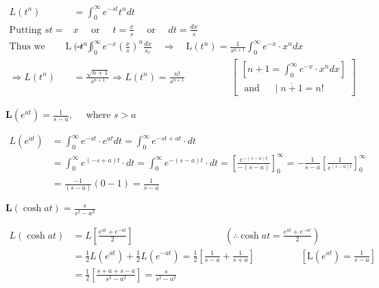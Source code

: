 \begin{answer}
	\begin{align*}
	L\left(t^{n}\right)&=\int_{0}^{\infty} e^{-s t} t^{n} d t\\
	\text{Putting }s t=&x \quad\text{ or }\quad t=\frac{x}{s} \quad\text{ or } \quad d t=\frac{d x}{s}\\
	\text{Thus we have}\mathrm{L}\left(t^{n}\right)&=\int_{0}^{\infty} e^{-x}\left(\frac{x}{s}\right)^{n} \frac{d x}{s_{r}} \quad \Rightarrow \quad \mathrm{L}\left(t^{n}\right)=\frac{1}{s^{n+1}} \int_{0}^{\infty} e^{-x} \cdot x^{n} d x\\
	\Rightarrow L\left(t^{n}\right)&=\frac{\sqrt{n+1}}{s^{n+1}} \Rightarrow L\left(t^{n}\right)=\frac{n !}{s^{n+1}}\hspace{2cm}\left[\begin{array}{c}
	{\left[n+1=\int_{0}^{\infty} e^{-x} \cdot x^{n} d x\right] } \\
	\text { and } \quad \mid \overline{n+1}=n !
	\end{array}\right]
	\end{align*}
\end{answer}
\begin{exercise}
	$\mathbf{L}\left(e^{a t}\right)=\frac{1}{s-a}, \quad$ where $s>a$
\end{exercise}
\begin{answer}
	\begin{align*}
	L\left(e^{a t}\right) &=\int_{0}^{\infty} e^{-s t} \cdot e^{a t} d t=\int_{0}^{\infty} e^{-s t+a t} \cdot d t \\
	&=\int_{0}^{\infty} e^{(-s+a) t} \cdot d t=\int_{0}^{\infty} e^{-(s-a) t} \cdot d t=\left[\frac{e^{-(s-a) t}}{-(s-a)}\right]_{0}^{\infty}=-\frac{1}{s-a}\left[\frac{1}{e^{(s-a) t}}\right]_{0}^{\infty}\\
	&=\frac{-1}{(s-a)}(0-1)=\frac{1}{s-a}
	\end{align*}
\end{answer}
\begin{exercise}
	$\mathbf{L}(\cosh a t)=\frac{s}{s^{2}-a^{2}}$
\end{exercise}
\begin{answer}
	\begin{align*}
	L(\cosh a t) &=L\left[\frac{e^{a t}+e^{-a t}}{2}\right] \hspace{4cm}\left(\therefore \cosh a t=\frac{e^{a t}+e^{-a t}}{2}\right)\\
	&=\frac{1}{2} L\left(e^{a t}\right)+\frac{1}{2} L\left(e^{-a t}\right)=\frac{1}{2}\left[\frac{1}{s-a}+\frac{1}{s+a}\right] \hspace{2cm}\left[\mathrm{L}\left(e^{a t}\right)=\frac{1}{s-a}\right]\\
	&=\frac{1}{2}\left[\frac{s+a+s-a}{s^{2}-a^{2}}\right]=\frac{s}{s^{2}-a^{2}}
	\end{align*}
\end{answer}
